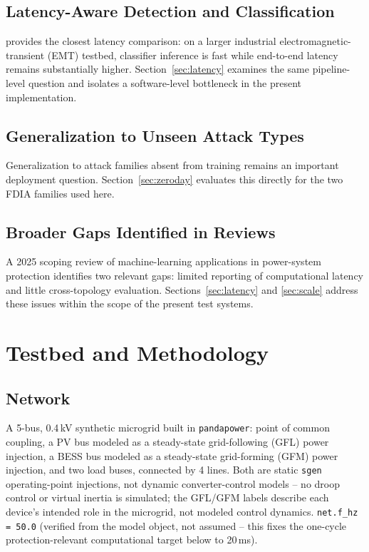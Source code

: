 \documentclass[conference]{IEEEtran}
\begin{document}
\subsection{Latency-Aware Detection and Classification}
\cite{abukhousa2026latency} provides the closest latency comparison: on a larger industrial electromagnetic-transient (EMT) testbed, classifier inference is fast while end-to-end latency remains substantially higher. Section~\ref{sec:latency} examines the same pipeline-level question and isolates a software-level bottleneck in the present implementation.

\subsection{Generalization to Unseen Attack Types}
Generalization to attack families absent from training remains an important deployment question. Section~\ref{sec:zeroday} evaluates this directly for the two FDIA families used here.

\subsection{Broader Gaps Identified in Reviews}
A 2025 scoping review of machine-learning applications in power-system protection \cite{oelhaf2025scoping} identifies two relevant gaps: limited reporting of computational latency and little cross-topology evaluation. Sections~\ref{sec:latency} and \ref{sec:scale} address these issues within the scope of the present test systems.

\section{Testbed and Methodology}
\label{sec:method}

\subsection{Network}
A 5-bus, 0.4\,kV synthetic microgrid built in \texttt{pandapower}: point of common coupling, a PV bus modeled as a steady-state grid-following (GFL) power injection, a BESS bus modeled as a steady-state grid-forming (GFM) power injection, and two load buses, connected by 4 lines. Both are static \texttt{sgen} operating-point injections, not dynamic converter-control models -- no droop control or virtual inertia is simulated; the GFL/GFM labels describe each device's intended role in the microgrid, not modeled control dynamics. \texttt{net.f\_hz = 50.0} (verified from the model object, not assumed -- this fixes the one-cycle protection-relevant computational target below to 20\,ms).
\end{document}
